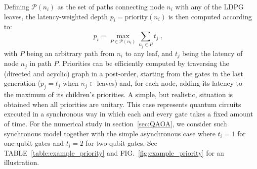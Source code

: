 \documentclass[%
onecolumn,pra,
superscriptaddress,
nofootinbib,
 amsmath,amssymb,
 aps,
11pt,
]{revtex4-1}
\begin{document}
Defining $\mathcal{P}(n_i)$ as the set of paths connecting node $n_i$ with any of the LDPG leaves, the latency-weighted depth $p_i=\text{priority}(n_i)$ is then computed according to:
\begin{equation}
	p_i = \max_{P\in\mathcal{P}(n_i)} \sum_{n_j\in P} t_j \; ,
\end{equation}
with $P$ being an arbitrary path from $n_i$ to any leaf, and $t_j$ being the latency of node $n_j$ in path $P$.
Priorities can be efficiently computed by traversing the (directed and acyclic) graph in a post-order, starting from the gates in the last generation ($p_j=t_j$ when $n_j\in\,$leaves) and, for each node, adding its latency to the maximum of its children's priorities. A simple, but realistic, situation is obtained when all priorities are unitary. This case represents quantum circuits executed in a synchronous way in which each and every gate takes a fixed amount of time. For the numerical study in section~\ref{sec:QAOA}, we consider such synchronous model together with the simple asynchronous case where $t_i=1$ for one-qubit gates and $t_i=2$ for two-qubit gates. See TABLE~\ref{table:example_priority} and FIG.~\ref{fig:example_priority} for an illustration.
\end{document}
